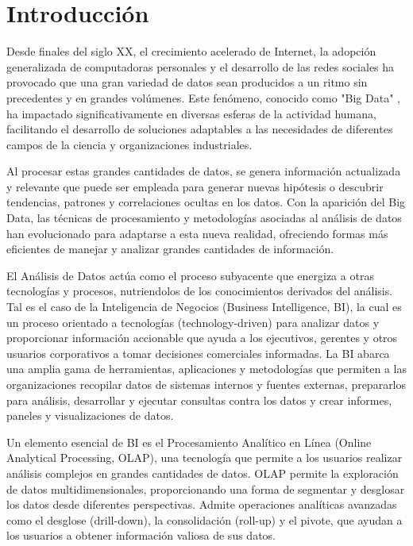 \chapter*{Introducción}\label{chapter:introduction}

Desde finales del siglo XX, el crecimiento acelerado de Internet, la adopci\'on generalizada de computadoras 
personales y el desarrollo de las redes sociales ha provocado que una gran variedad de datos sean producidos a un ritmo 
sin precedentes y en grandes vol\'umenes. 
Este fen\'omeno, conocido como "Big Data" \cite{beyer2012importance}, ha impactado significativamente en diversas 
esferas de la actividad humana, facilitando el desarrollo de soluciones adaptables a las necesidades de diferentes 
campos de la ciencia y organizaciones industriales.

Al procesar estas grandes cantidades de datos, se genera información actualizada y relevante que puede ser empleada 
para generar nuevas hipótesis o descubrir tendencias, patrones y correlaciones ocultas en los datos. Con la aparición del 
Big Data, las técnicas de procesamiento y metodologías asociadas al análisis de datos han evolucionado para adaptarse a esta 
nueva realidad, ofreciendo formas más eficientes de manejar y analizar grandes cantidades de información.

El An\'alisis de Datos act\'ua como el proceso subyacente que energiza a otras tecnolog\'ias y procesos, nutriendolos
de los conocimientos derivados del an\'alisis. Tal es el 
caso de la Inteligencia de Negocios (Business Intelligence, BI), la cual es un proceso orientado a tecnolog\'ias (technology-driven) 
para analizar datos y proporcionar información accionable que ayuda a los ejecutivos, gerentes y otros usuarios corporativos 
a tomar decisiones comerciales informadas. La BI abarca una amplia gama de herramientas, aplicaciones y metodologías 
que permiten a las organizaciones recopilar datos de sistemas internos y fuentes externas, prepararlos para análisis, 
desarrollar y ejecutar consultas contra los datos y crear informes, paneles y visualizaciones de datos\cite{negash2004business}. 

Un elemento esencial de BI es el Procesamiento Analítico en Línea (Online Analytical Processing, OLAP), una tecnología que 
permite a los usuarios realizar análisis complejos en grandes cantidades de datos. OLAP permite la exploración de datos 
multidimensionales, proporcionando una forma de segmentar y desglosar los datos desde diferentes perspectivas. Admite 
operaciones analíticas avanzadas como el desglose (drill-down), la consolidación (roll-up) y el pivote, que ayudan a los 
usuarios a obtener información valiosa de sus datos.

